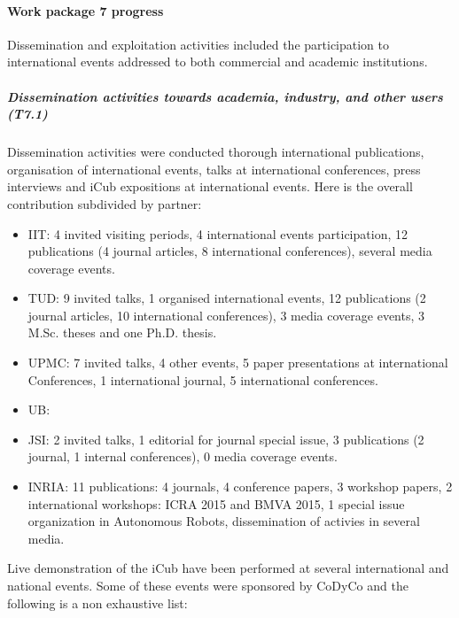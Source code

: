 

\paragraph{Work package 7 progress}

Dissemination and exploitation activities included the participation to international events addressed to both commercial and academic institutions. 

\subparagraph*{Dissemination activities towards academia, industry, and other users (T7.1)}

Dissemination activities were conducted thorough international publications, organisation of international events, talks at international conferences, press interviews and iCub expositions at international events. Here is the overall contribution subdivided by partner:

\begin{itemize}

\item IIT: 4 invited visiting periods, 4 international events participation, 12 publications (4 journal articles, 8 international conferences), several media coverage events.

\item TUD: 9 invited talks, 1 organised international events, 12 publications (2 journal articles, 10 international conferences), 3 media coverage events, 3 M.Sc. theses and one Ph.D. thesis. 

\item UPMC: 7 invited talks, 4 other events, 5 paper presentations at international Conferences, 1 international journal, 5 international conferences.

\item UB: 

\item JSI: 2 invited talks, 1 editorial for journal special issue, 3 publications (2 journal, 1 internal conferences), 0 media coverage events.

\item INRIA: 11 publications: 4 journals, 4 conference papers, 3 workshop papers, 2 international workshops: ICRA 2015 and BMVA 2015, 1 special issue organization in Autonomous Robots, dissemination of activies in several media.

\end{itemize}

Live demonstration of the iCub have been performed at several international and national events.  Some of these events were sponsored by CoDyCo and the following is a non exhaustive list:

